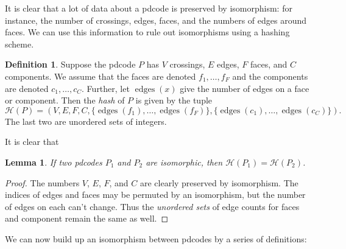 \documentclass[amsmath,secnumarabic,floatfix,amssymb,nofootinbib,nobibnotes,letterpaper,11pt,tightenlines,showkeys]{revtex4}
\newtheorem{lemma}[theorem]{Lemma}
\theoremstyle{definition}
\newtheorem{definition}[theorem]{Definition}
\newcommand{\pdcode}{pdcode }
\newcommand{\pdcodes}{pdcodes }
\newcommand{\edges}{\operatorname{edges}}
\begin{document}
It is clear that a lot of data about a \pdcode is preserved by isomorphism: for instance, the number of crossings, edges, faces, and the numbers of edges around faces. We can use this information to rule out isomorphisms using a hashing scheme.

\begin{definition}
Suppose the \pdcode $P$ has $V$ crossings, $E$ edges, $F$ faces, and $C$ components. We assume that the faces are denoted $f_1, \dots, f_F$ and the components are denoted $c_1, \dots, c_C$. Further, let $\edges(x)$ give the number of edges on a face or component. Then the \emph{hash} of $P$ is given by the tuple
\begin{equation*}
\mathcal{H}(P) = (V,E,F,C,\{ \edges(f_1), \dots, \edges(f_F) \},
 \{ \edges(c_1), \dots, \edges(c_C) \}).
\end{equation*}
The last two are unordered sets of integers.
\end{definition}

It is clear that
\begin{lemma}
If two \pdcodes $P_1$ and $P_2$ are isomorphic, then $\mathcal{H}(P_1) = \mathcal{H}(P_2)$.
\end{lemma}

\begin{proof}
The numbers $V$, $E$, $F$, and $C$ are clearly preserved by isomorphism. The indices of edges and faces may be permuted by an isomorphism, but the number of edges on each can't change. Thus the \emph{unordered sets} of edge counts for faces and component remain the same as well.
\end{proof}

We can now build up an isomorphism between pdcodes by a series of definitions:
\end{document}
